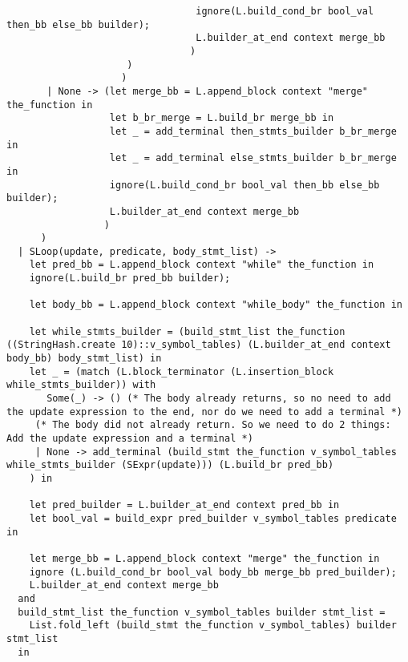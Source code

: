 \documentclass{article}
\begin{document}
\begin{verbatim}
                                 ignore(L.build_cond_br bool_val then_bb else_bb builder);
                                 L.builder_at_end context merge_bb
                                )
                     )
                    )
       | None -> (let merge_bb = L.append_block context "merge" the_function in
                  let b_br_merge = L.build_br merge_bb in
                  let _ = add_terminal then_stmts_builder b_br_merge in
                  let _ = add_terminal else_stmts_builder b_br_merge in
                  ignore(L.build_cond_br bool_val then_bb else_bb builder);
                  L.builder_at_end context merge_bb
                 )
      )
  | SLoop(update, predicate, body_stmt_list) ->
    let pred_bb = L.append_block context "while" the_function in
    ignore(L.build_br pred_bb builder);

    let body_bb = L.append_block context "while_body" the_function in

    let while_stmts_builder = (build_stmt_list the_function ((StringHash.create 10)::v_symbol_tables) (L.builder_at_end context body_bb) body_stmt_list) in
    let _ = (match (L.block_terminator (L.insertion_block while_stmts_builder)) with
       Some(_) -> () (* The body already returns, so no need to add the update expression to the end, nor do we need to add a terminal *)
     (* The body did not already return. So we need to do 2 things: Add the update expression and a terminal *)
     | None -> add_terminal (build_stmt the_function v_symbol_tables while_stmts_builder (SExpr(update))) (L.build_br pred_bb)
    ) in

    let pred_builder = L.builder_at_end context pred_bb in
    let bool_val = build_expr pred_builder v_symbol_tables predicate in

    let merge_bb = L.append_block context "merge" the_function in
    ignore (L.build_cond_br bool_val body_bb merge_bb pred_builder);
    L.builder_at_end context merge_bb
  and
  build_stmt_list the_function v_symbol_tables builder stmt_list = 
    List.fold_left (build_stmt the_function v_symbol_tables) builder stmt_list
  in


\end{verbatim}
\end{document}
